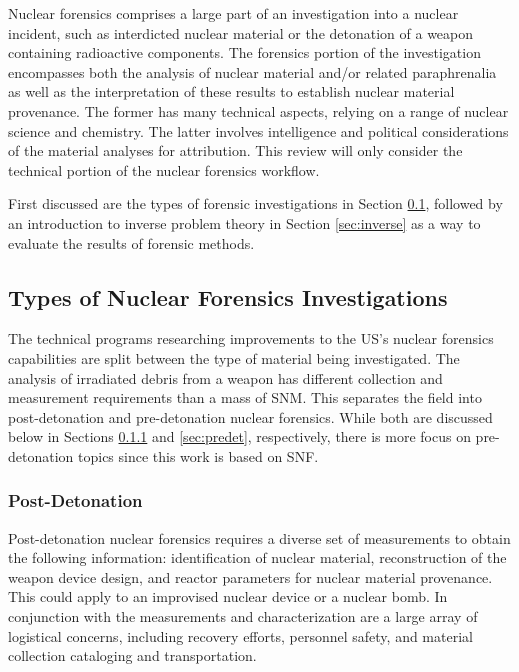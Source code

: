 Nuclear forensics comprises a large part of an investigation into a nuclear
incident, such as interdicted nuclear material or the detonation of a weapon
containing radioactive components.  The forensics portion of the investigation
encompasses both the analysis of nuclear material and/or related paraphrenalia
as well as the interpretation of these results to establish nuclear material
provenance. The former has many technical aspects, relying on a range of
nuclear science and chemistry.  The latter involves intelligence and political
considerations of the material analyses for attribution. This review will only
consider the technical portion of the nuclear forensics workflow.

First discussed are the types of forensic investigations in Section
\ref{sec:types}, followed by an introduction to inverse problem theory in
Section \ref{sec:inverse} as a way to evaluate the results of forensic methods. 

\subsection{Types of Nuclear Forensics Investigations}
\label{sec:types}

The technical programs researching improvements to the \gls{US}'s nuclear
forensics capabilities are split between the type of material being
investigated. The analysis of irradiated debris from a weapon has different
collection and measurement requirements than a mass of \gls{SNM}. This
separates the field into post-detonation and pre-detonation nuclear forensics.
While both are discussed below in Sections \ref{sec:postdet} and
\ref{sec:predet}, respectively, there is more focus on pre-detonation topics
since this work is based on \gls{SNF}.

\subsubsection{Post-Detonation}
\label{sec:postdet}

Post-detonation nuclear forensics requires a diverse set of measurements to
obtain the following information: identification of nuclear material,
reconstruction of the weapon device design, and reactor parameters for nuclear
material provenance. This could apply to an improvised nuclear device or a
nuclear bomb.  In conjunction with the measurements and characterization are a
large array of logistical concerns, including recovery efforts, personnel
safety, and material collection cataloging and transportation.

